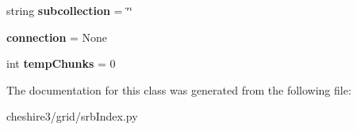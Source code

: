 \begin{DoxyCompactItemize}
\item 
\hypertarget{classcheshire3_1_1grid_1_1srb_index_1_1_srb_bdb_index_store_ad4601ed62fca5aacaa6b26058adfbe0f}{string {\bfseries subcollection} = \char`\"{}\char`\"{}}\label{classcheshire3_1_1grid_1_1srb_index_1_1_srb_bdb_index_store_ad4601ed62fca5aacaa6b26058adfbe0f}

\item 
\hypertarget{classcheshire3_1_1grid_1_1srb_index_1_1_srb_bdb_index_store_a43a23d7c8010b3c4713f876d0a0db06d}{{\bfseries connection} = None}\label{classcheshire3_1_1grid_1_1srb_index_1_1_srb_bdb_index_store_a43a23d7c8010b3c4713f876d0a0db06d}

\item 
\hypertarget{classcheshire3_1_1grid_1_1srb_index_1_1_srb_bdb_index_store_a6c705e6bc028b7c701b215238b5ef418}{int {\bfseries temp\-Chunks} = 0}\label{classcheshire3_1_1grid_1_1srb_index_1_1_srb_bdb_index_store_a6c705e6bc028b7c701b215238b5ef418}

\end{DoxyCompactItemize}


The documentation for this class was generated from the following file\-:\begin{DoxyCompactItemize}
\item 
cheshire3/grid/srb\-Index.\-py\end{DoxyCompactItemize}

